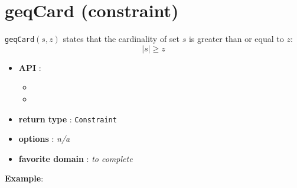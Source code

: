 \label{geqcard}
\hypertarget{geqcard}{}

\section{geqCard (constraint)}\label{geqcard:geqcardconstraint}\hypertarget{geqcard:geqcardconstraint}{}
\begin{notedef}
  \texttt{geqCard}$(s,z)$ states that the cardinality of set $s$ is greater than or equal to $z$:
$$|s| \ge z$$
\end{notedef}

\begin{itemize}
	\item \textbf{API} :
	\begin{itemize}
		\item {}
		\item {}
	\end{itemize}
	\item \textbf{return type} : \texttt{Constraint}
	\item \textbf{options} : \emph{n/a}
	\item \textbf{favorite domain} : \emph{to complete}
\end{itemize}

\textbf{Example}:

